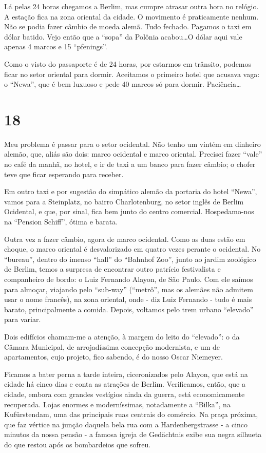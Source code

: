 Lá pelas 24 horas chegamos a Berlim, mas cumpre atrasar outra hora no relógio. A estação fica na zona oriental da cidade. O movimento é praticamente nenhum. Não se podia fazer câmbio de moeda alemã. Tudo fechado. Pagamos o taxi em dólar batido. Vejo então que a “sopa” da Polônia acabou\ldots O dólar aqui vale apenas 4 marcos e 15 “pfenings”.

Como o visto do passaporte é de 24 horas, por estarmos em trânsito, podemos ficar no setor oriental para dormir. Aceitamos o primeiro hotel que acusava vaga: o “Newa”, que é bem luxuoso e pede 40 marcos só para dormir. Paciência\ldots

\section*{18 \adfflatleafright {}}
Meu problema é passar para o setor ocidental. Não tenho um vintém em dinheiro alemão, que, aliás são dois: marco ocidental e marco oriental. Precisei fazer “vale” no café da manhã, no hotel, e ir de taxi a um banco para fazer câmbio; o chofer teve que ficar esperando para receber.

Em outro taxi e por sugestão do simpático alemão da portaria do hotel “Newa”, vamos para a Steinplatz, no bairro Charlotenburg, no setor inglês de Berlim Ocidental, e que, por sinal, fica bem junto do centro comercial. Hospedamo-nos na “Pension Schiff”, ótima e barata.

Outra vez a fazer câmbio, agora de marco ocidental. Como as duas estão em choque, o marco oriental é desvalorizado em quatro vezes perante o ocidental. No “bureau”, dentro do imenso “hall” do “Bahnhof Zoo”, junto ao jardim zoológico de Berlim, temos a surpresa de encontrar outro patrício festivalista e companheiro de bordo: o Luiz Fernando Alayon, de São Paulo. Com ele saímos para almoçar, viajando pelo “sub-way” (“metrô”, mas os alemães não admitem usar o nome francês), na zona oriental, onde - diz Luiz Fernando - tudo é mais barato, principalmente a comida. Depois, voltamos pelo trem urbano “elevado” para variar.

Dois edifícios chamam-me a atenção, à margem do leito do “elevado”: o da Câmara Municipal, de arrojadíssima concepção modernista, e um de apartamentos, cujo projeto, fico sabendo, é do nosso Oscar Niemeyer.

Ficamos a bater perna a tarde inteira, ciceronizados pelo Alayon, que está na cidade há cinco dias e conta as atrações de Berlim. Verificamos, então, que a cidade, embora com grandes vestígios ainda da guerra, está economicamente recuperada. Lojas enormes e moderníssimas, notadamente a “Bilka”, na Kufürstendam, uma das principais ruas centrais do comércio. Na praça próxima, que faz vértice na junção daquela bela rua com a Hardenbergstrasse - a cinco minutos da nossa pensão - a famosa igreja de Gedächtnis exibe sua negra silhueta do que restou após os bombardeios que sofreu.

